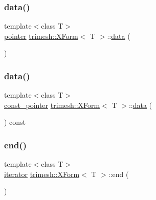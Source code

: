 \mbox{\label{classtrimesh_1_1XForm_aa0e187a87bb6f928a0d97369a037920a}} 
\subsubsection{\texorpdfstring{data()}{data()}\hspace{0.1cm}{\footnotesize\ttfamily [1/2]}}
{\footnotesize\ttfamily template$<$class T$>$ \\
\hyperlink{classtrimesh_1_1XForm_a0ff7a6cb20d209f32be3ab3779077029}{pointer} \hyperlink{classtrimesh_1_1XForm}{trimesh\+::\+X\+Form}$<$ T $>$\+::\hyperlink{namespacetrimesh_ad9c3b218c6c8bf976dbcd9afb8740bb8}{data} (\begin{DoxyParamCaption}{ }\end{DoxyParamCaption})\hspace{0.3cm}{\ttfamily [inline]}}

\mbox{\label{classtrimesh_1_1XForm_a2b15919c5025ee49748b8154b8e48877}} 
\subsubsection{\texorpdfstring{data()}{data()}\hspace{0.1cm}{\footnotesize\ttfamily [2/2]}}
{\footnotesize\ttfamily template$<$class T$>$ \\
\hyperlink{classtrimesh_1_1XForm_a0cfc3dd93b0190520e3152ef27a32117}{const\+\_\+pointer} \hyperlink{classtrimesh_1_1XForm}{trimesh\+::\+X\+Form}$<$ T $>$\+::\hyperlink{namespacetrimesh_ad9c3b218c6c8bf976dbcd9afb8740bb8}{data} (\begin{DoxyParamCaption}{ }\end{DoxyParamCaption}) const\hspace{0.3cm}{\ttfamily [inline]}}

\mbox{\label{classtrimesh_1_1XForm_ac5474374e32212bf81d416429ceee288}} 
\subsubsection{\texorpdfstring{end()}{end()}\hspace{0.1cm}{\footnotesize\ttfamily [1/2]}}
{\footnotesize\ttfamily template$<$class T$>$ \\
\hyperlink{classtrimesh_1_1XForm_a8894e55e986e53231663e774060ca200}{iterator} \hyperlink{classtrimesh_1_1XForm}{trimesh\+::\+X\+Form}$<$ T $>$\+::end (\begin{DoxyParamCaption}{ }\end{DoxyParamCaption})\hspace{0.3cm}{\ttfamily [inline]}}



